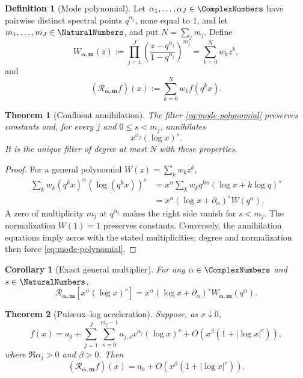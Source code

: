 \documentclass[11pt,oneside]{article}
\numberwithin{equation}{section}
\newtheorem{theorem}{Theorem}[section]
\newtheorem{corollary}[corollary]{Corollary}
\theoremstyle{definition}
\newtheorem{definition}[definition]{Definition}
\theoremstyle{remark}
\newcommand{\Rc}{\mathcal R}
\begin{document}
\begin{definition}[Mode polynomial]
Let $\alpha_1,\ldots,\alpha_J\in\ComplexNumbers$ have pairwise distinct spectral
points $q^{\alpha_j}$, none equal to $1$, and let $m_1,\ldots,m_J\in\NaturalNumbers$, and put $N=\sum_jm_j$.  Define
\begin{equation}
 W_{\bm\alpha,\bm m}(z)
 :=\prod_{j=1}^J
 \left(\frac{z-q^{\alpha_j}}{1-q^{\alpha_j}}\right)^{m_j}
 =\sum_{k=0}^Nw_kz^k,
 \label{eq:mode-polynomial}
\end{equation}
and
\[
 (\Rc_{\bm\alpha,\bm m}f)(x):=\sum_{k=0}^Nw_kf(q^kx).
\]
\end{definition}

\begin{theorem}[Confluent annihilation]
The filter \eqref{eq:mode-polynomial} preserves constants and, for every
$j$ and $0\le s<m_j$, annihilates
\[
 x^{\alpha_j}(\log x)^s.
\]
It is the unique filter of degree at most $N$ with these properties.
\end{theorem}

\begin{proof}
For a general polynomial $W(z)=\sum_kw_kz^k$,
\begin{align*}
 \sum_kw_k(q^kx)^\alpha(\log(q^kx))^s
 &=x^\alpha\sum_kw_kq^{k\alpha}
   (\log x+k\log q)^s\\
 &=x^\alpha(\log x+\partial_\alpha)^sW(q^\alpha).
\end{align*}
A zero of multiplicity $m_j$ at $q^{\alpha_j}$ makes the right side vanish for
$s<m_j$.  The normalization $W(1)=1$ preserves constants.  Conversely, the
annihilation equations imply zeros with the stated multiplicities; degree and
normalization then force \eqref{eq:mode-polynomial}.
\end{proof}

\begin{corollary}[Exact general multiplier]
For any $\alpha\in\ComplexNumbers$ and $s\in\NaturalNumbers$,
\begin{equation}
 \Rc_{\bm\alpha,\bm m}
 [x^\alpha(\log x)^s]
 =x^\alpha(\log x+\partial_\alpha)^s
  W_{\bm\alpha,\bm m}(q^\alpha).
 \label{eq:general-mode-multiplier}
\end{equation}
\end{corollary}

\begin{theorem}[Puiseux--log acceleration]
Suppose, as $x\downarrow0$,
\begin{equation}
 f(x)=a_0+
 \sum_{j=1}^J\sum_{s=0}^{m_j-1}
 a_{j,s}x^{\alpha_j}(\log x)^s
 +O\!\left(x^\beta(1+|\log x|^r)\right),
 \label{eq:puiseux-log-expansion}
\end{equation}
where $\Re\alpha_j>0$ and $\beta>0$.  Then
\begin{equation}
 (\Rc_{\bm\alpha,\bm m}f)(x)
 =a_0+O\!\left(x^\beta(1+|\log x|^r)\right).
 \label{eq:puiseux-acceleration}
\end{equation}
\end{theorem}
\end{document}
